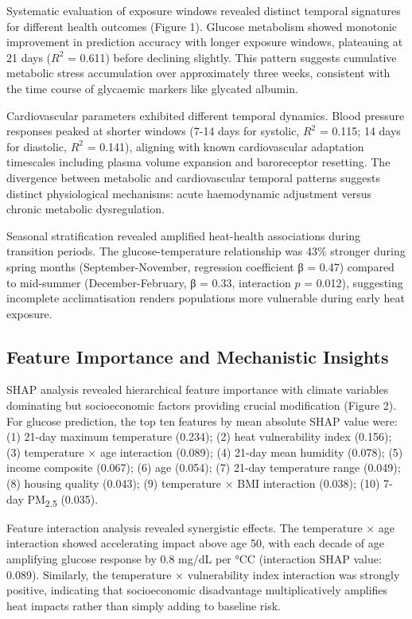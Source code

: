 \documentclass[11pt,a4paper]{article}
\newcommand{\degrees}{°C}
\begin{document}
Systematic evaluation of exposure windows revealed distinct temporal signatures for different health outcomes (Figure 1). Glucose metabolism showed monotonic improvement in prediction accuracy with longer exposure windows, plateauing at 21 days ($R^2$ = 0.611) before declining slightly. This pattern suggests cumulative metabolic stress accumulation over approximately three weeks, consistent with the time course of glycaemic markers like glycated albumin.

Cardiovascular parameters exhibited different temporal dynamics. Blood pressure responses peaked at shorter windows (7-14 days for systolic, $R^2$ = 0.115; 14 days for diastolic, $R^2$ = 0.141), aligning with known cardiovascular adaptation timescales including plasma volume expansion and baroreceptor resetting. The divergence between metabolic and cardiovascular temporal patterns suggests distinct physiological mechanisms: acute haemodynamic adjustment versus chronic metabolic dysregulation.

Seasonal stratification revealed amplified heat-health associations during transition periods. The glucose-temperature relationship was 43\% stronger during spring months (September-November, regression coefficient β = 0.47) compared to mid-summer (December-February, β = 0.33, interaction $p$ = 0.012), suggesting incomplete acclimatisation renders populations more vulnerable during early heat exposure.

\subsection{Feature Importance and Mechanistic Insights}

SHAP analysis revealed hierarchical feature importance with climate variables dominating but socioeconomic factors providing crucial modification (Figure 2). For glucose prediction, the top ten features by mean absolute SHAP value were: (1) 21-day maximum temperature (0.234); (2) heat vulnerability index (0.156); (3) temperature × age interaction (0.089); (4) 21-day mean humidity (0.078); (5) income composite (0.067); (6) age (0.054); (7) 21-day temperature range (0.049); (8) housing quality (0.043); (9) temperature × BMI interaction (0.038); (10) 7-day PM\textsubscript{2.5} (0.035).

Feature interaction analysis revealed synergistic effects. The temperature × age interaction showed accelerating impact above age 50, with each decade of age amplifying glucose response by 0.8 mg/dL per \degrees C (interaction SHAP value: 0.089). Similarly, the temperature × vulnerability index interaction was strongly positive, indicating that socioeconomic disadvantage multiplicatively amplifies heat impacts rather than simply adding to baseline risk.
\end{document}
